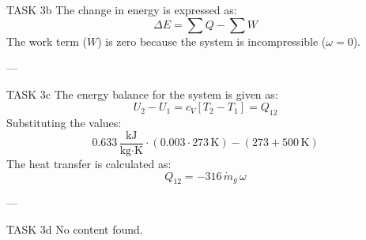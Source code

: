 TASK 3b  
The change in energy is expressed as:  
\[
\Delta E = \sum Q - \sum W
\]  
The work term (\( \dot{W} \)) is zero because the system is incompressible (\( \omega = 0 \)).

---

TASK 3c  
The energy balance for the system is given as:  
\[
U_2 - U_1 = c_V \left[ T_2 - T_1 \right] = Q_{12}
\]  
Substituting the values:  
\[
0.633 \, \frac{\text{kJ}}{\text{kg·K}} \cdot \left( 0.003 \cdot 273 \, \text{K} \right) - \left( 273 + 500 \, \text{K} \right)
\]  
The heat transfer is calculated as:  
\[
Q_{12} = -316 \, \dot{m}_g \, \omega
\]

---

TASK 3d  
No content found.